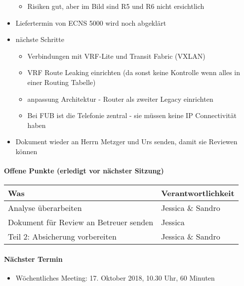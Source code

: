 \begin{itemize}
	\begin{itemize}
		\item Risiken gut, aber im Bild sind R5 und R6 nicht ersichtlich
	\end{itemize}
	\item Liefertermin von ECNS 5000 wird noch abgeklärt
	\item nächste Schritte
	\begin{itemize}
		\item Verbindungen mit VRF-Lite und Transit Fabric (VXLAN)
		\item VRF Route Leaking einrichten (da sonst keine Kontrolle wenn alles in einer Routing Tabelle)
		\item anpassung Architektur - Router als zweiter Legacy einrichten
		\item Bei FUB ist die Telefonie zentral - sie müssen keine IP Connectivität haben
	\end{itemize}
	\item Dokument wieder an Herrn Metzger und Urs senden, damit sie Reviewen können
\end{itemize}


\paragraph{Offene Punkte (erledigt vor nächster Sitzung)} \mbox{}
\begin{table}[H]
	\centering
	\begin{tabularx}{\textwidth}{X | p{4.5cm}}
		\rowcolor{gray!50}
		\textbf{Was} & \textbf{Verantwortlichkeit} \\
		\hline	
		Analyse überarbeiten & Jessica \& Sandro  \\
		Dokument für Review an Betreuer senden & Jessica \\
		Teil 2: Absicherung vorbereiten & Jessica \& Sandro \\
	\end{tabularx}
	\label{tab:my-label}
\end{table}

\paragraph{Nächster Termin}
\begin{itemize}	
	\item Wöchentliches Meeting: 17. Oktober 2018, 10.30 Uhr, 60 Minuten
\end{itemize}


